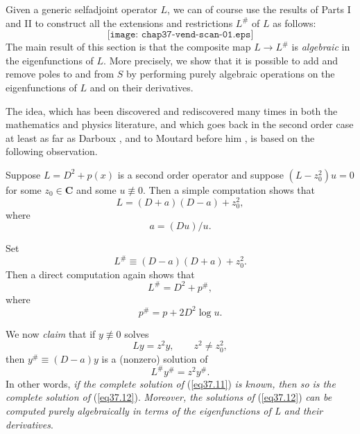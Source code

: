 \documentclass{surv-l}
\theoremstyle{plain}
\theoremstyle{definition}
\numberwithin{equation}{chapter}
\begin{document}
Given a generic selfadjoint operator $L$, we can of course use the results of Parts I and II to construct all
the extensions and restrictions $L^{\#}$ of $L$ as follows:
\begin{equation*}
\texttt{[image: chap37-vend-scan-01.eps]}
\end{equation*}
The main result of this section is that the composite map $L\rightarrow L^{\#}$ is \emph{algebraic} in the eigenfunctions of $L$. More precisely, we show that it is possible to add and remove poles to and from $S$ by performing purely algebraic operations on the eigenfunctions of $L$ and on their derivatives.

The idea, which has been discovered and rediscovered many times in both the mathematics and physics literature, and which goes back in the second order case at least as far as Darboux \cite{Da}, and to Moutard before him \cite{Mo}, is based on the following observation.

Suppose $L=D^{2}+p(x)$ is a second order operator and suppose $(L-z_{0}^{2})u=0$ for some $z_{0}\in \mathbf{C}$ and some $u\not\equiv 0$. Then a simple computation shows that
\begin{equation}\label{eq37.6}
L=(D+a)(D-a)+z_{0}^{2},
\end{equation}
where
\begin{equation}\label{eq37.7}
a=(Du)/u.
\end{equation}

Set
\begin{equation}\label{eq37.8}
L^{\#}\equiv(D-a)(D+a)+z_{0}^{2}.
\end{equation}
Then a direct computation again shows that
\begin{equation}\label{eq37.9}
L^{\#}=D^{2}+p^{\#},
\end{equation}
where
\begin{equation}\label{eq37.10}
p^{\#}=p+2D^{2}\log u.
\end{equation}

We now \emph{claim} that if $y\not\equiv 0$ solves
\begin{equation}\label{eq37.11}
Ly=z^{2}y, \qquad z^{2}\neq z_{0}^{2},
\end{equation}
then $y^{\#}\equiv(D-a)y$ is a (nonzero) solution of
\begin{equation}\label{eq37.12}
L^{\#}y^{\#}=z^{2}y^{\#}.
\end{equation}
In other words, \emph{if the complete solution of} (\ref{eq37.11}) \emph{is known, then so is the complete solution of} (\ref{eq37.12}). \emph{Moreover, the solutions of} (\ref{eq37.12}) \emph{can be computed purely algebraically in terms of the eigenfunctions of L and their derivatives}.
\end{document}
